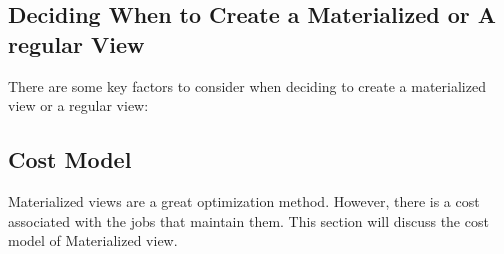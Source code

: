  
\subsection{Deciding When to Create a Materialized or A regular View}\vspace{0.4cm}

There are some key factors to consider when deciding to create a materialized view or a regular view:\vspace{0.4cm}


\vspace{1cm}

 \subsection{Cost Model}
Materialized views are a great optimization method. However, there is a cost associated with the jobs that maintain them. This section will discuss the cost model of Materialized view.\vspace{.4cm}

